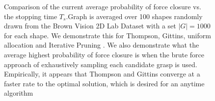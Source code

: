 \documentclass[10pt, conference]{ieeeconf}      %
\begin{document}
  
   

\begin{figure}%
    \centering

    \caption{Comparison of the current average probability of force closure vs. the stopping time $T_s$.Graph is averaged over 100 shapes randomly drawn from the Brown Vision 2D Lab Dataset \cite{brown} with a set $|G|=1000$ for each shape.  We demonstrate this for Thompson, Gittins, uniform allocation and Iterative Pruning \cite{kehoe2012estimating}. We also demonstrate what the average highest probability of force closure is when the brute force approach of exhaustively sampling each candidate grasp is used. Empirically, it appears that Thompson and Gittins converge at a faster rate to the optimal solution, which is desired for an anytime algorithm  }%
    \label{fig:grasp_quality}
\end{figure}
\end{document}
